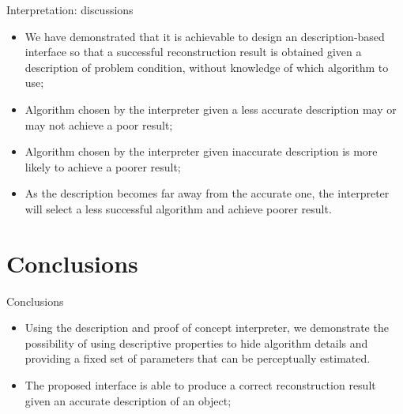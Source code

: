 \documentclass[10pt]{beamer}
\begin{document}
\begin{frame}{Interpretation: discussions}

\begin{exampleblock}{}
\begin{itemize}
\item We have demonstrated that it is achievable to design an description-based interface so that a successful reconstruction result is obtained given a description of problem condition, without knowledge of which algorithm to use;
\item Algorithm chosen by the interpreter given a less accurate description may or may not achieve a poor result;
\item Algorithm chosen by the interpreter given inaccurate description is more likely to achieve a poorer result;
\item As the description becomes far away from the accurate one, the interpreter will select a less successful algorithm and achieve poorer result.
\end{itemize}
\end{exampleblock}

\end{frame}

\section{Conclusions}
\begin{frame}{Conclusions}

\begin{exampleblock}{}

\begin{itemize}
\item Using the description and proof of concept interpreter, we demonstrate the possibility of using descriptive properties to hide algorithm details and providing a fixed set of parameters that can be perceptually estimated.
\item The proposed interface is able to produce a correct reconstruction result given an accurate description of an object;
\end{itemize}

\end{exampleblock}

\end{frame}
\end{document}
